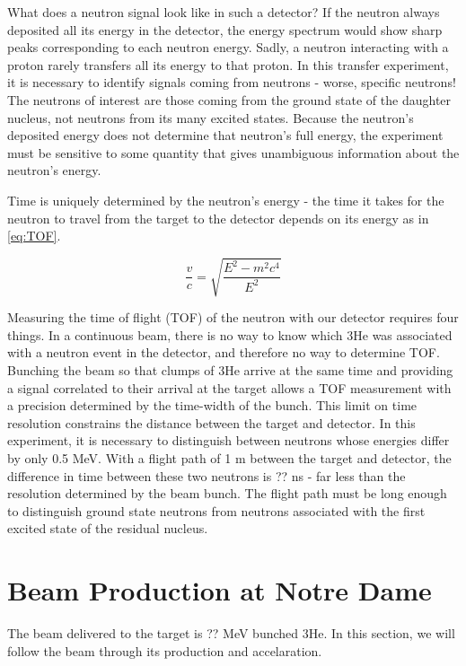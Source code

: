 What does a neutron signal look like in such a detector?  If the neutron always deposited all its energy in the detector, the energy spectrum would show sharp peaks corresponding to each neutron energy.  Sadly, a neutron interacting with a proton rarely transfers all its energy to that proton.  In this transfer experiment, it is necessary to identify signals coming from neutrons - worse, specific neutrons!  The neutrons of interest are those coming from the ground state of the daughter nucleus, not neutrons from its many excited states.  Because the neutron's deposited energy does not determine that neutron's full energy, the experiment must be sensitive to some quantity that gives unambiguous information about the neutron's energy.


Time is uniquely determined by the neutron's energy - the time it takes for the neutron to travel from the target to the detector depends on its energy as in \eq \ref{eq:TOF}.  

\begin{equation}
\frac{v}{c} = \sqrt{\frac{E^2 - m^2c^4}{E^2}}
\label{eq:TOF}
\end{equation}

Measuring the time of flight (TOF) of the neutron with our detector requires four things.  In a continuous beam, there is no way to know which 3He was associated with a neutron event in the detector, and therefore no way to determine TOF.  Bunching the beam so that clumps of 3He arrive at the same time and providing a signal correlated to their arrival at the target allows a TOF measurement with a precision determined by the time-width of the bunch.  This limit on time resolution constrains the distance between the target and detector.  In this experiment, it is necessary to distinguish between neutrons whose energies differ by only 0.5 MeV.  With a flight path of 1 m between the target and detector, the difference in time between these two neutrons is ?? ns - far less than the resolution determined by the beam bunch.  The flight path must be long enough to distinguish ground state neutrons from neutrons associated with the first excited state of the residual nucleus.

\section{Beam Production at Notre Dame}
The beam delivered to the target is ?? MeV bunched 3He.  In this section, we will follow the beam through its production and accelaration.

